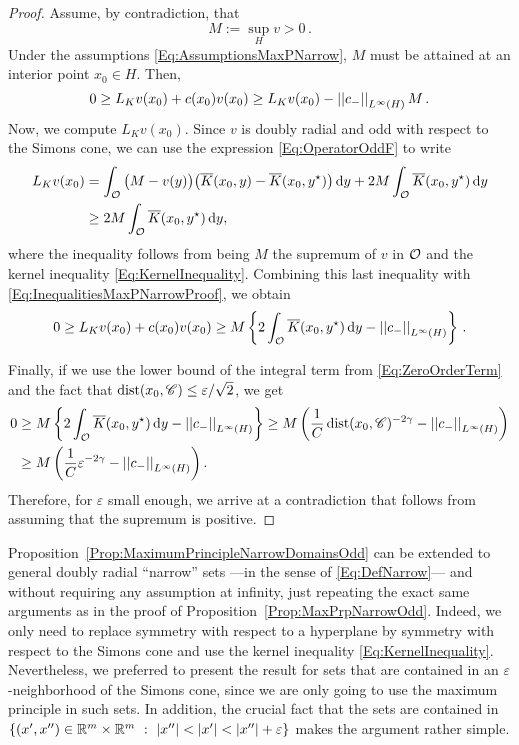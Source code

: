 \begin{proof}
	Assume, by contradiction, that
	$$
	M := \sup_H v > 0\,.
	$$
	Under the assumptions \eqref{Eq:AssumptionsMaxPNarrow}, $M$ must be attained at an interior point $x_0 \in H$. Then,
	\begin{equation}
	\label{Eq:InequalitiesMaxPNarrowProof}
	0 \geq L_K  v(x_0) + c(x_0)v(x_0) \geq L_K  v(x_0) - \left | \left |{c_-} \right | \right |_{L^\infty(H)}M\,.
	\end{equation} 
	Now, we compute $L_K  v(x_0)$. Since $v$ is doubly radial and odd with respect to the Simons cone, we can use the expression \eqref{Eq:OperatorOddF} to write
	\begin{align*}
	L_K v(x_0) &= \int_{\mathcal{O}} \big (M - v(y) \big) \big (\overline{K}(x_0,y) -\overline{K}(x_0,y^\star)\big) \,\mathrm{d} y + 2M\int_{\mathcal{O}} \overline{K}(x_0,y^\star)\,\mathrm{d} y\\
    &\geq2M \int_{\mathcal{O}} \overline{K}(x_0,y^\star)\,\mathrm{d} y,
	\end{align*}
    where the inequality follows from being $M$ the supremum of $v$ in $\mathcal{O}$ and the kernel inequality \eqref{Eq:KernelInequality}. Combining this last inequality with \eqref{Eq:InequalitiesMaxPNarrowProof}, we obtain
	$$
	0 \geq L_K  v(x_0) + c(x_0)v(x_0)  \geq M \left\{ 2 \int_{\mathcal{O}} \overline{K}(x_0,y^\star)\,\mathrm{d} y - \left | \left |{c_-} \right | \right |_{L^\infty(H)}
	\right\}\,.
	$$
	
	Finally, if we use the lower bound of the integral term from \eqref{Eq:ZeroOrderTerm} and the fact that $\operatorname{dist}(x_0,\mathscr{C}) \leq \varepsilon/\sqrt{2}$, we get
	\begin{align*}
	0 &\geq M \left\{ 2 \int_{\mathcal{O}} \overline{K}(x_0,y^\star)\,\mathrm{d} y - \left | \left |{c_-} \right | \right |_{L^\infty(H)}
	\right\} \geq M \left(\frac{1}{C}\operatorname{dist}(x_0,\mathscr{C})^{-2\gamma}-\left | \left |{c_-} \right | \right |_{L^\infty(H)}\right) \\ &\geq M \left(\frac{1}{C}\varepsilon^{-2\gamma}-\left | \left |{c_-} \right | \right |_{L^\infty(H)}\right).
	\end{align*}
	Therefore, for $\varepsilon$ small enough, we arrive at a contradiction that follows from assuming that the supremum is positive.
\end{proof}

\begin{remark}
	Proposition~\ref{Prop:MaximumPrincipleNarrowDomainsOdd} can be extended to general doubly radial ``narrow'' sets ---in the sense of \eqref{Eq:DefNarrow}--- and without requiring any assumption at infinity, just repeating the exact same arguments as in the proof of Proposition~\ref{Prop:MaxPrpNarrowOdd}. Indeed, we only need to replace symmetry with respect to a hyperplane by symmetry with respect to the Simons cone and use the kernel inequality \eqref{Eq:KernelInequality}. Nevertheless, we preferred to present the result for sets that are contained in an $\varepsilon$-neighborhood of the Simons cone, since we are only going to use the maximum principle in such sets. In addition, the crucial fact that the sets are contained in $\{(x',x'')\in \R^m\times\R^m \ : \ |x''|<|x'|<|x''|+ \varepsilon\}$ makes the argument rather simple.
\end{remark}


